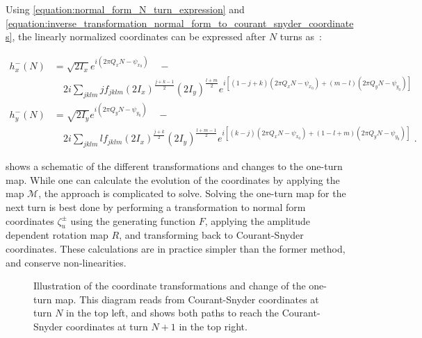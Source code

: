 Using \cref{equation:normal_form_N_turn_expression} and \cref{equation:inverse_transformation_normal_form_to_courant_snyder_coordinates}, the linearly normalized coordinates can be expressed after \(N\) turns as~\cite{CERN:Bartolini:Normal_Form_Tracking_Beam_Data}:

\begin{equation}
    \begin{aligned}
        h_x^{-}(N) & = \sqrt{2 I_x} e^{i \left( 2 \pi Q_x N - \psi_{x_0} \right)} \quad - \\
        & \quad 2 i \sum_{jklm} j f_{jklm} \left( 2 I_x \right)^{\frac{j+k-1}{2}} \left( 2 I_y \right)^{\frac{l+m}{2}}   e^{i \left[ (1-j+k) \left( 2 \pi Q_x N - \psi_{x_0} \right) + (m-l)   \left( 2 \pi Q_y N - \psi_{y_0} \right) \right]} \\
        h_y^{-}(N) & = \sqrt{2 I_y} e^{i \left( 2 \pi Q_y N - \psi_{y_0} \right)} \quad - \\
        & \quad 2 i \sum_{jklm} l f_{jklm} \left( 2 I_x \right)^{\frac{j+k}{2}}   \left( 2 I_y \right)^{\frac{l+m-1}{2}} e^{i \left[ (k-j)   \left( 2 \pi Q_x N - \psi_{x_0} \right) + (1-l+m) \left( 2 \pi Q_y N - \psi_{y_0} \right) \right]} \text{ .}
    \end{aligned}
    \label{equation:linearly_normalized_coordinates_after_N_turns}
\end{equation}

 shows a schematic of the different transformations and changes to the one-turn map.
While one can calculate the evolution of the  coordinates by applying the map \( \mathcal{M} \), the approach is complicated to solve.
Solving the one-turn map for the next turn is best done by performing a transformation to normal form coordinates \(\zeta_{u}^{\pm}\) using the generating function \(F\), applying the amplitude dependent rotation map \(R\), and transforming back to Courant-Snyder coordinates.
These calculations are in practice simpler than the former method, and conserve non-linearities.

\begin{figure}[!htb]
    \centering
    \caption{Illustration of the coordinate transformations and change of the one-turn map. This diagram reads from Courant-Snyder coordinates at turn \(N\) in the top left, and shows both paths to reach the Courant-Snyder coordinates at turn \(N+1\) in the top right.}
    \label{figure:coordinate_transformations}
\end{figure}


